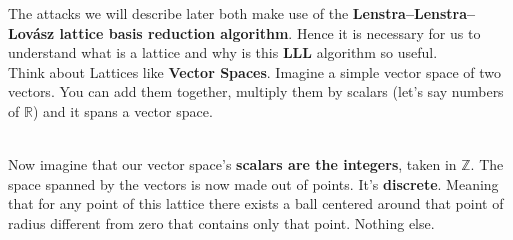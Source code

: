 \documentclass[a4paper,11pt]{article}
\begin{document}
The attacks we will describe later both make use of the \textbf{Lenstra–Lenstra–Lovász lattice basis reduction algorithm}. Hence it is necessary for us to understand what is a lattice and why is this \textbf{LLL} algorithm so useful.\\
Think about Lattices like \textbf{Vector Spaces}. Imagine a simple vector space of two vectors. You can add them together, multiply them by scalars (let's say numbers of $\mathbb{R}$) and it spans a vector space.\\

\\

Now imagine that our vector space's \textbf{scalars are the integers}, taken in $\mathbb{Z}$. The space spanned by the vectors is now made out of points. It's \textbf{discrete}. Meaning that for any point of this lattice there exists a ball centered around that point of radius different from zero that contains only that point. Nothing else.\\
\end{document}
